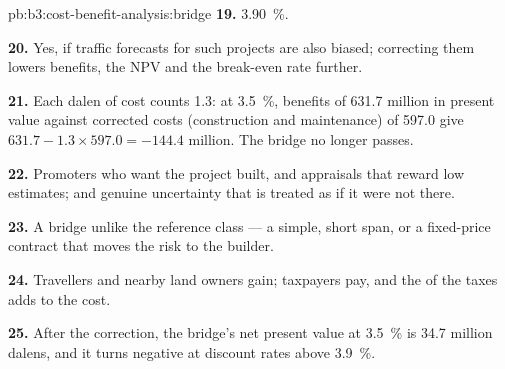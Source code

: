 \begin{solution}{pb:b3:cost-benefit-analysis:bridge}
\textbf{19.} 3.90~\%.

\textbf{20.} Yes, if traffic forecasts for such projects are also biased; correcting them
lowers benefits, the NPV and the break-even rate further.

\textbf{21.} Each dalen of cost counts 1.3: at 3.5~\%, benefits of 631.7 million in present value
against corrected costs (construction and maintenance) of 597.0 give $631.7 - 1.3 \times 597.0 =
-144.4$ million. The bridge no longer passes.

\textbf{22.} Promoters who want the project built, and appraisals that reward low
estimates; and genuine uncertainty that is treated as if it were not there.

\textbf{23.} A bridge unlike the reference class --- a simple, short span, or a fixed-price
contract that moves the risk to the builder.

\textbf{24.} Travellers and nearby land owners gain; taxpayers pay, and the 
of the taxes adds to the cost.

\textbf{25.} After the correction, the bridge's net present value at 3.5~\% is 34.7 million
dalens, and it turns negative at discount rates above 3.9~\%.
\end{solution}
